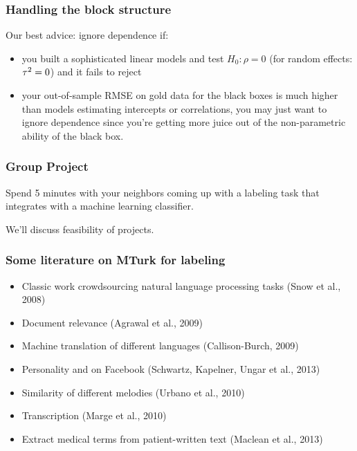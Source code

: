 \documentclass[slides]{beamer} %
\begin{document}
\begin{frame}\frametitle{Handling the block structure}

Our best advice: ignore dependence if:

\begin{itemize}
\item you built a sophisticated linear models and test $H_0: \rho = 0$ (for random effects: $\tau^2 = 0$) and it fails to reject
\item your out-of-sample RMSE on gold data for the black boxes is much higher than models estimating intercepts or correlations, you may just want to ignore dependence since you're getting more juice out of the non-parametric ability of the black box.
\end{itemize}

\end{frame}

\begin{frame}\frametitle{Group Project}

\centering

Spend 5 minutes with your neighbors coming up with a labeling task that integrates with a machine learning classifier.


We'll discuss feasibility of projects.

\end{frame}

\begin{frame}\frametitle{Some literature on MTurk for labeling}

\begin{itemize}
\item Classic work crowdsourcing natural language processing tasks (Snow et al., 2008)
\item Document relevance (Agrawal et al., 2009)
\item Machine translation of different languages (Callison-Burch, 2009)
\item Personality and  on Facebook  (Schwartz, Kapelner, Ungar et al., 2013)
\item Similarity of different melodies (Urbano et al., 2010)
\item Transcription (Marge et al., 2010)
\item Extract medical terms from patient-written text (Maclean et al., 2013) 
\end{itemize}

\end{frame}
\end{document}
